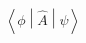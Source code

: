 \begin{equation*}[niji]
 \left\langle\phi
 \middle|\hat A\middle|\psi
 \right\rangle
\end{equation*}
